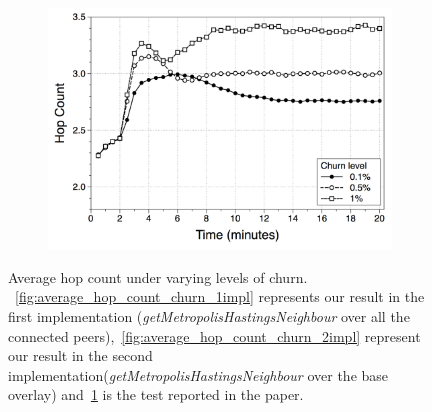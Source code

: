 \begin{figure}
\begin{subfigure}{.5\textwidth}
  \includegraphics[keepaspectratio=true, width=1\linewidth]{images/paper_average_hop_count_churn}
  \caption{}
  \label{fig:paper_average_hop_count_churn}
\end{subfigure}
\caption{Average hop count under varying levels of churn. ~\ref{fig:average_hop_count_churn_1impl} represents our result in the first implementation (\textit{getMetropolisHastingsNeighbour} over all the connected peers),~\ref{fig:average_hop_count_churn_2impl} represent our result in the second implementation(\textit{getMetropolisHastingsNeighbour} over the base overlay) and~\ref{fig:paper_average_hop_count_churn} is the test reported in the paper.}
\label{fig:robustness_hop_count_churn}
\end{figure}

